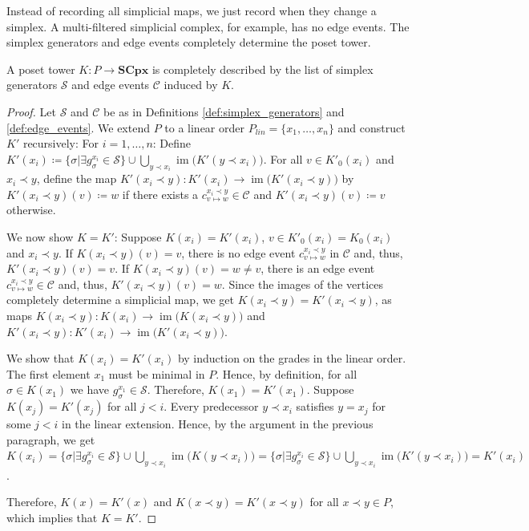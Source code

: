 \documentclass[english,a4paper,nolineno,cleveref]{socg-lipics-v2021}
\DeclareMathOperator{\im}{im}
\begin{document}
Instead of recording all simplicial maps, we just record when they change a simplex. A multi-filtered simplicial complex, for example, has no edge events. The simplex generators and edge events completely determine the poset tower.

\begin{proposition} \label{prop:tower_from_generators_events}
A poset tower $K\colon P\rightarrow \mathbf{SCpx}$ is completely described by the list of simplex generators $\mathcal{S}$ and edge events $\mathcal{C}$ induced by $K$.   
\end{proposition}

\begin{proof}
Let $\mathcal{S}$ and $\mathcal{C}$ be as in Definitions \ref{def:simplex_generators} and \ref{def:edge_events}. We extend $P$ to a linear order $P_{lin}=\{x_1,\ldots,x_n\}$ and construct $K'$ recursively: For $i=1,\ldots, n$: Define $K'(x_i)\coloneqq \{\sigma\vert \exists g_\sigma^{x_i}\in\mathcal{S}\}\cup\bigcup_{y\prec x_i}\im\!\big( K'(y\prec x_i)\big)$. For all $v\in K'_0(x_i)$ and $x_i\prec y$, define the map $K'(x_i\prec y)\colon K'(x_i)\rightarrow \im\!\big(K'(x_i\prec y)\big)$ by $K'(x_i\prec y)(v)\coloneqq w$ if there exists a $c_{v\mapsto w}^{x_i\prec y}\in \mathcal{C}$ and $K'(x_i\prec y)(v)\coloneqq v$ otherwise. 

We now show $K=K'$: Suppose $K(x_i)=K'(x_i)$, $v\in K'_0(x_i)=K_0(x_i)$ and $x_i\prec y$. If $K(x_i\prec y)(v)=v$, there is no edge event $c_{v\mapsto w}^{x_i\prec y}$  in $\mathcal{C}$ and, thus, $K'(x_i\prec y)(v)=v$. If $K(x_i\prec y)(v)=w\neq v$, there is an edge event $c_{v\mapsto w}^{x_i\prec y}\in \mathcal{C}$ and, thus, $K'(x_i\prec y)(v)=w$. Since the images of the vertices completely determine a simplicial map, we get $K(x_i\prec y)=K'(x_i\prec y)$, as maps $K(x_i\prec y)\colon K(x_i)\rightarrow\im\big(K(x_i\prec y)\big)$ and $K'(x_i\prec y)\colon K'(x_i)\rightarrow\im\big(K'(x_i\prec y)\big)$.

We show that $K(x_i)=K'(x_i)$ by induction on the grades in the linear order. The first element $x_1$ must be minimal in $P$. Hence, by definition, for all $\sigma\in K(x_1)$ we have $g^{x_1}_\sigma\in\mathcal{S}$. Therefore, $K(x_1)=K'(x_1)$. Suppose $K(x_j)=K'(x_j)$ for all $j<i$. Every predecessor $y\prec x_i$ satisfies $y=x_j$ for some $j<i$ in the linear extension. Hence, by the argument in the previous paragraph, we get $K(x_i)=\{\sigma\vert \exists g_\sigma^{x_i}\in\mathcal{S}\}\cup\bigcup_{y\prec x_i}\im\!\big( K(y\prec x_i)\big)=\{\sigma\vert \exists g_\sigma^{x_i}\in\mathcal{S}\}\cup\bigcup_{y\prec x_i}\im \!\big(K'(y\prec x_i)\big)=K'(x_i)$. 

Therefore, $K(x)=K'(x)$ and $K(x\prec y)=K'(x\prec y)$ for all $x\prec y\in P$, which implies that $K=K'$.
\end{proof}
\end{document}
